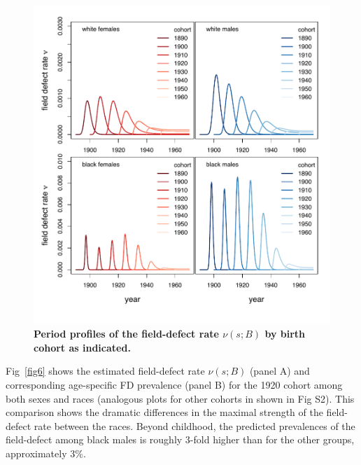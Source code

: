 \documentclass[10pt,letterpaper]{article}
\begin{document}
\begin{figure}[t]
\includegraphics[scale=0.8, trim=0 0 0 40]{Fig5.pdf}
\caption{{\bf Period profiles of the field-defect rate $\nu(s;B)$ by birth cohort as indicated.}}
\label{fig5}
\end{figure}

Fig~\ref{fig6} shows the estimated field-defect rate $\nu(s; B)$ (panel A) and corresponding age-specific FD prevalence (panel B) for the 1920 cohort among both sexes and races (analogous plots for other cohorts in shown in Fig S2). This comparison shows the dramatic differences in the maximal strength of the field-defect rate between the races. Beyond childhood, the predicted prevalences of the field-defect among black males is roughly 3-fold higher than for the other groups, approximately 3$\%$.     
\end{document}
